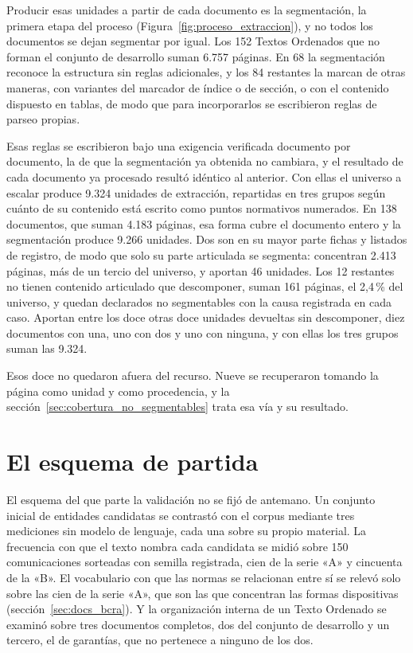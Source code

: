 \documentclass[12pt,a4paper]{report}
\begin{document}
Producir esas unidades a partir de cada documento es la segmentación, la primera etapa del proceso (Figura~\ref{fig:proceso_extraccion}), y no todos los documentos se dejan segmentar por igual. Los 152 Textos Ordenados que no forman el conjunto de desarrollo suman 6.757 páginas. En 68 la segmentación reconoce la estructura sin reglas adicionales, y los 84 restantes la marcan de otras maneras, con variantes del marcador de índice o de sección, o con el contenido dispuesto en tablas, de modo que para incorporarlos se escribieron reglas de parseo propias.

Esas reglas se escribieron bajo una exigencia verificada documento por documento, la de que la segmentación ya obtenida no cambiara, y el resultado de cada documento ya procesado resultó idéntico al anterior. Con ellas el universo a escalar produce 9.324 unidades de extracción, repartidas en tres grupos según cuánto de su contenido está escrito como puntos normativos numerados. En 138 documentos, que suman 4.183 páginas, esa forma cubre el documento entero y la segmentación produce 9.266 unidades. Dos son en su mayor parte fichas y listados de registro, de modo que solo su parte articulada se segmenta: concentran 2.413 páginas, más de un tercio del universo, y aportan 46 unidades. Los 12 restantes no tienen contenido articulado que descomponer, suman 161 páginas, el 2,4\,\% del universo, y quedan declarados no segmentables con la causa registrada en cada caso. Aportan entre los doce otras doce unidades devueltas sin descomponer, diez documentos con una, uno con dos y uno con ninguna, y con ellas los tres grupos suman las 9.324.

Esos doce no quedaron afuera del recurso. Nueve se recuperaron tomando la página como unidad y como procedencia, y la sección~\ref{sec:cobertura_no_segmentables} trata esa vía y su resultado.

\section{El esquema de partida}
\label{sec:esquema_partida}

El esquema del que parte la validación no se fijó de antemano. Un conjunto inicial de entidades candidatas se contrastó con el corpus mediante tres mediciones sin modelo de lenguaje, cada una sobre su propio material. La frecuencia con que el texto nombra cada candidata se midió sobre 150 comunicaciones sorteadas con semilla registrada, cien de la serie «A» y cincuenta de la «B». El vocabulario con que las normas se relacionan entre sí se relevó solo sobre las cien de la serie «A», que son las que concentran las formas dispositivas (sección~\ref{sec:docs_bcra}). Y la organización interna de un Texto Ordenado se examinó sobre tres documentos completos, dos del conjunto de desarrollo y un tercero, el de garantías, que no pertenece a ninguno de los dos.
\end{document}
